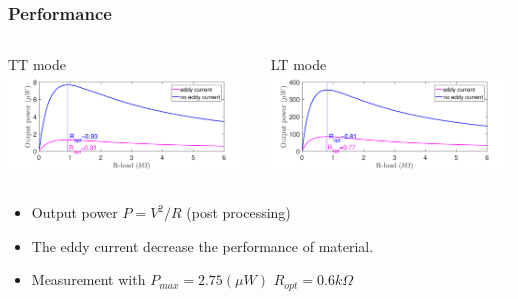 \documentclass[compress]{beamer}
\begin{document}
\begin{frame}\frametitle{Performance}
\begin{columns}[totalwidth=\textwidth]
   \begin{column}{.49\textwidth}
       \begin{block}{TT mode}
    {
        \includegraphics[height=0.4\textwidth ,width=0.99\textwidth]{Graphic/TT_compare_power.pdf}
    }
    \end{block}

   \end{column}
   \begin{column}{.49\textwidth}
       \begin{block}{LT mode}
    {
        \includegraphics[height=0.4\textwidth ,width=0.99\textwidth]{Graphic/LT_compare_power.pdf}
    }
    \end{block}
   \end{column}
\end{columns}
\begin{itemize}
\item Output power $P=V^2/R$ (post processing)
\item The eddy current decrease the performance of material.
\item Measurement with $P_{max}=2.75(\mu W)$ $R_{opt}=0.6 k\Omega$
\end{itemize}
\end{frame}
\end{document}
